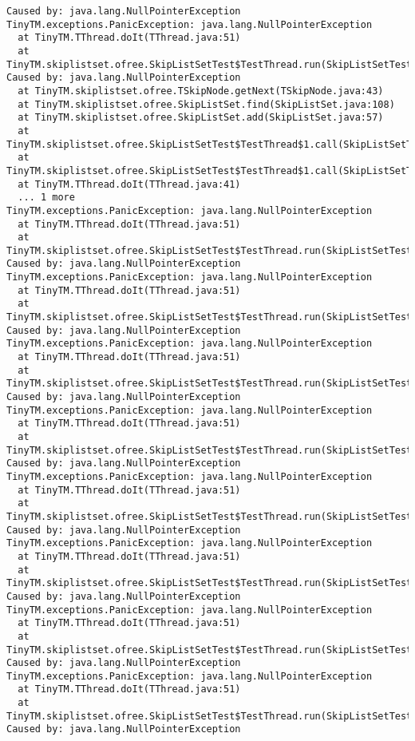 \begin{verbatim}
Caused by: java.lang.NullPointerException
TinyTM.exceptions.PanicException: java.lang.NullPointerException
  at TinyTM.TThread.doIt(TThread.java:51)
  at
TinyTM.skiplistset.ofree.SkipListSetTest$TestThread.run(SkipListSetTest.java:128)
Caused by: java.lang.NullPointerException
  at TinyTM.skiplistset.ofree.TSkipNode.getNext(TSkipNode.java:43)
  at TinyTM.skiplistset.ofree.SkipListSet.find(SkipListSet.java:108)
  at TinyTM.skiplistset.ofree.SkipListSet.add(SkipListSet.java:57)
  at
TinyTM.skiplistset.ofree.SkipListSetTest$TestThread$1.call(SkipListSetTest.java:130)
  at
TinyTM.skiplistset.ofree.SkipListSetTest$TestThread$1.call(SkipListSetTest.java:128)
  at TinyTM.TThread.doIt(TThread.java:41)
  ... 1 more
TinyTM.exceptions.PanicException: java.lang.NullPointerException
  at TinyTM.TThread.doIt(TThread.java:51)
  at
TinyTM.skiplistset.ofree.SkipListSetTest$TestThread.run(SkipListSetTest.java:128)
Caused by: java.lang.NullPointerException
TinyTM.exceptions.PanicException: java.lang.NullPointerException
  at TinyTM.TThread.doIt(TThread.java:51)
  at
TinyTM.skiplistset.ofree.SkipListSetTest$TestThread.run(SkipListSetTest.java:128)
Caused by: java.lang.NullPointerException
TinyTM.exceptions.PanicException: java.lang.NullPointerException
  at TinyTM.TThread.doIt(TThread.java:51)
  at
TinyTM.skiplistset.ofree.SkipListSetTest$TestThread.run(SkipListSetTest.java:128)
Caused by: java.lang.NullPointerException
TinyTM.exceptions.PanicException: java.lang.NullPointerException
  at TinyTM.TThread.doIt(TThread.java:51)
  at
TinyTM.skiplistset.ofree.SkipListSetTest$TestThread.run(SkipListSetTest.java:128)
Caused by: java.lang.NullPointerException
TinyTM.exceptions.PanicException: java.lang.NullPointerException
  at TinyTM.TThread.doIt(TThread.java:51)
  at
TinyTM.skiplistset.ofree.SkipListSetTest$TestThread.run(SkipListSetTest.java:128)
Caused by: java.lang.NullPointerException
TinyTM.exceptions.PanicException: java.lang.NullPointerException
  at TinyTM.TThread.doIt(TThread.java:51)
  at
TinyTM.skiplistset.ofree.SkipListSetTest$TestThread.run(SkipListSetTest.java:128)
Caused by: java.lang.NullPointerException
TinyTM.exceptions.PanicException: java.lang.NullPointerException
  at TinyTM.TThread.doIt(TThread.java:51)
  at
TinyTM.skiplistset.ofree.SkipListSetTest$TestThread.run(SkipListSetTest.java:128)
Caused by: java.lang.NullPointerException
TinyTM.exceptions.PanicException: java.lang.NullPointerException
  at TinyTM.TThread.doIt(TThread.java:51)
  at
TinyTM.skiplistset.ofree.SkipListSetTest$TestThread.run(SkipListSetTest.java:128)
Caused by: java.lang.NullPointerException

\end{verbatim}
